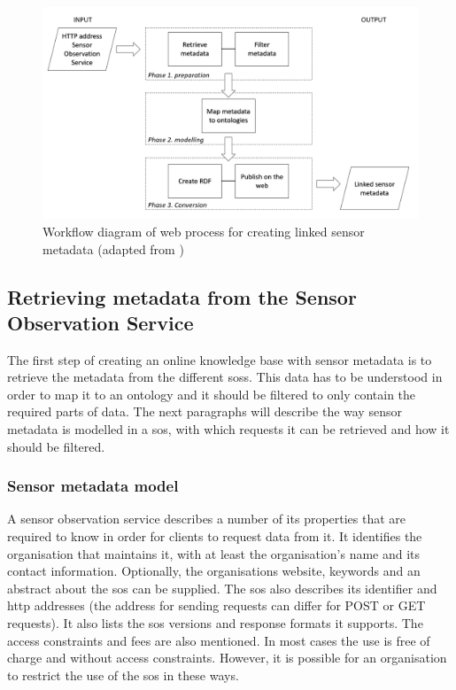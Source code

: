\begin{figure}
	\centering
	\includegraphics[width=1\linewidth]{UML/wps1workflow.PNG}
	\caption{Workflow diagram of web process for creating linked sensor metadata (adapted from \cite{LD:Missier})}
	\label{fig:WPS1workflow}
\end{figure}

\subsection{Retrieving metadata from the Sensor Observation Service}
\label{chap:retrieveSOS}

The first step of creating an online knowledge base with sensor metadata is to retrieve the metadata from the different \aclp{sos}. This data has to be understood in order to map it to an ontology and it should be filtered to only contain the required parts of data. The next paragraphs will describe the way sensor metadata is modelled in a \ac{sos}, with which requests it can be retrieved and how it should be filtered. 

\subsubsection{Sensor metadata model}
A sensor observation service describes a number of its properties that are required to know in order for clients to request data from it. It identifies the organisation that maintains it, with at least the organisation's name and its contact information. Optionally, the organisations website, keywords and an abstract about the \ac{sos} can be supplied. The \ac{sos} also describes its identifier and \ac{http} addresses (the address for sending requests can differ for POST or GET requests). It also lists the \ac{sos} versions and response formats it supports. The access constraints and fees are also mentioned. In most cases the use is free of charge and without access constraints. However, it is possible for an organisation to restrict the use of the \ac{sos} in these ways.  

